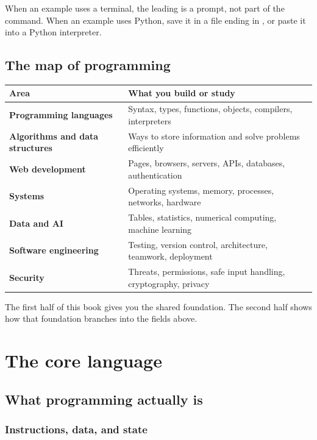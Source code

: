 \documentclass[11pt,openany,oneside]{book}
\newcommand{\inlinecode}[1]{\texttt{\small\detokenize{#1}}}
\begin{document}
When an example uses a terminal, the leading \inlinecode{\$} is a prompt, not part of the command. When an example uses Python, save it in a file ending in \inlinecode{.py}, or paste it into a Python interpreter.

\chapter*{The map of programming}

\begin{tabularx}{\textwidth}{>{\raggedright\arraybackslash\sffamily\bfseries\color{teal}}p{} >{\raggedright\arraybackslash}X}
\toprule
Area & What you build or study \\
\midrule
Programming languages & Syntax, types, functions, objects, compilers, interpreters \\
Algorithms and data structures & Ways to store information and solve problems efficiently \\
Web development & Pages, browsers, servers, APIs, databases, authentication \\
Systems & Operating systems, memory, processes, networks, hardware \\
Data and AI & Tables, statistics, numerical computing, machine learning \\
Software engineering & Testing, version control, architecture, teamwork, deployment \\
Security & Threats, permissions, safe input handling, cryptography, privacy \\
\bottomrule
\end{tabularx}

The first half of this book gives you the shared foundation. The second half shows how that foundation branches into the fields above.

\tableofcontents
\mainmatter

\part{The core language}

\chapter{What programming actually is}

\section{Instructions, data, and state}
\end{document}
